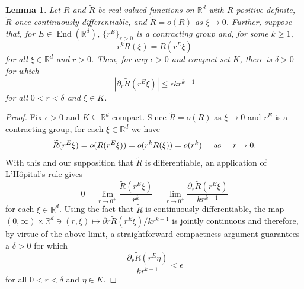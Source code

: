 \documentclass[11pt]{article}
\newtheorem{lemma}[theorem]{Lemma}
\newcommand\End{\operatorname{End}} %
\begin{document}
\begin{lemma}\label{lem:LHopital_and_oP}
Let $R$ and $\widetilde{R}$ be real-valued functions on $\mathbb{R}^d$ with $R$ positive-definite, $\widetilde{R}$ once continuously differentiable, and $\widetilde{R}=o(R)$ as $\xi\to 0$. Further, suppose that, for $E\in \End(\mathbb{R}^d)$, $\{r^E\}_{r>0}$ is a contracting group and, for some $k\geq 1$,
\begin{equation*}
    r^kR(\xi)=R(r^E\xi)
\end{equation*}
for all $\xi\in\mathbb{R}^d$ and $r>0$. Then, for any $\epsilon>0$ and compact set $K$, there is $\delta>0$ for which
\begin{equation*}
    |\partial_r \widetilde{R}(r^E\xi)|\leq \epsilon k r^{k-1}
\end{equation*}
for all $0<r<\delta$ and $\xi\in K$.
\end{lemma}
\begin{proof}
Fix $\epsilon>0$ and $K\subseteq\mathbb{R}^d$ compact. Since  $\widetilde{R}=o(R)$ as $\xi\to 0$ and $r^E$ is a contracting group, for each $\xi\in \mathbb{R}^d$ we have \begin{equation*}
    \widetilde{R}(r^E\xi)=o(R(r^E\xi))=o(r^k R(\xi))=o(r^k)\hspace{.5cm}\mbox{as}\hspace{.5cm}r\to 0.
\end{equation*} 
With this and our supposition that $\widetilde{R}$ is differentiable, an application of L'H\^{o}pital's rule gives
\begin{equation*}
    0=\lim_{r\to 0^+}\frac{\widetilde{R}(r^E\xi)}{r^k}=\lim_{r\to 0^+}\frac{\partial_r \widetilde{R}(r^E\xi)}{kr^{k-1}}
\end{equation*}
for each $\xi\in \mathbb{R}^d$. Using the fact that $\widetilde{R}$ is continuously differentiable, the map $(0,\infty)\times \mathbb{R}^d\ni (r,\xi) \mapsto \partial r \widetilde{R}(r^E\xi)/kr^{k-1}$ is jointly continuous and therefore, by virtue of the above limit, a straightforward compactness argument guarantees a $\delta>0$ for which
\begin{equation*}
    \frac{\partial_r \widetilde{R}(r^E\eta)}{kr^{k-1}}<\epsilon
\end{equation*}
for all $0<r<\delta$ and $\eta\in K$. 
\end{proof}
\end{document}

